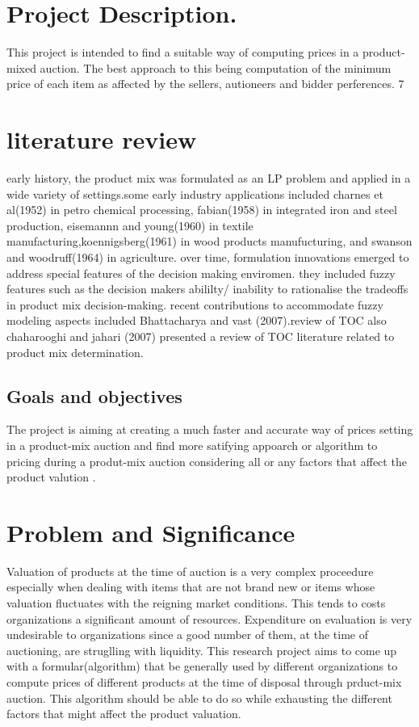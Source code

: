 \documentclass[11pt]{article} %
\begin{document}
\section{Project Description.}
This project is intended to find a  suitable way of computing prices in a product-mixed auction. The best approach to this being computation of the minimum price of each item as affected by the sellers, autioneers and bidder perferences.
7\section{literature review}
early history, the product mix was formulated as an LP problem and applied in a wide variety of settings.some early industry applications included charnes et al(1952) in petro chemical processing, fabian(1958) in integrated iron and steel production, eisemannn and young(1960) in textile manufacturing,koennigsberg(1961) in wood products manufucturing, and swanson and woodruff(1964) in agriculture. over time, formulation innovations emerged to address special features of the decision making enviromen. they included fuzzy features such as the decision makers abililty/ inability to rationalise the tradeoffs in product mix decision-making. recent contributions to accommodate fuzzy modeling aspects included Bhattacharya and vast (2007).review of TOC
also chaharooghi and jahari (2007) presented a review of TOC literature related to product mix determination.

 \subsection{Goals and objectives} 
 The project is aiming at creating a  much faster and accurate way of prices setting in a product-mix auction and find more satifying appoarch or algorithm to pricing during a produt-mix auction considering all or any factors that affect the product valution .

\section{Problem and Significance}
Valuation of products at the time of auction is a very complex proceedure especially when dealing with items that are not brand new or items whose valuation fluctuates with the reigning market conditions. This tends to costs organizations a significant amount of resources.
Expenditure on evaluation is very undesirable to organizations since a good number of them, at the time of auctioning, are struglling with liquidity.
This research project aims to come up with a formular(algorithm) that be generally used by different organizations to compute prices of different products at the time of disposal through prduct-mix auction. This algorithm should be able to do so while exhausting the different factors that might affect the product valuation.
\end{document}
